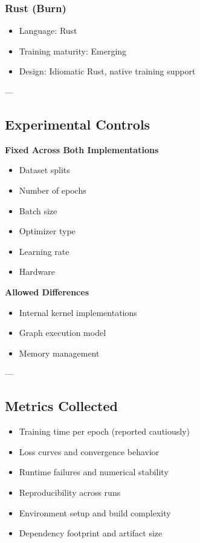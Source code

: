 \documentclass[10pt,a4paper,twocolumn]{article}
\begin{document}
\subsubsection{Rust (Burn)}
\begin{itemize}
    \item Language: Rust
    \item Training maturity: Emerging
    \item Design: Idiomatic Rust, native training support
\end{itemize}

---

\subsection{Experimental Controls}

\textbf{Fixed Across Both Implementations}
\begin{itemize}
    \item Dataset splits
    \item Number of epochs
    \item Batch size
    \item Optimizer type
    \item Learning rate
    \item Hardware
\end{itemize}

\textbf{Allowed Differences}
\begin{itemize}
    \item Internal kernel implementations
    \item Graph execution model
    \item Memory management
\end{itemize}

---

\subsection{Metrics Collected}

\begin{itemize}
    \item Training time per epoch (reported cautiously)
    \item Loss curves and convergence behavior
    \item Runtime failures and numerical stability
    \item Reproducibility across runs
    \item Environment setup and build complexity
    \item Dependency footprint and artifact size
\end{itemize}
\end{document}
